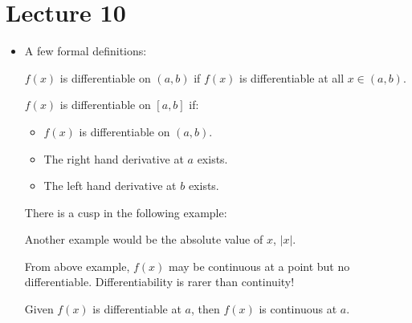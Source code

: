 \section{Lecture 10}
\begin{itemize}
    \item A few formal definitions:
    \begin{definition}
        $f(x)$ is differentiable on $(a,b)$ if $f(x)$ is differentiable at all $x\in (a,b)$.
    \end{definition}
    \begin{definition}
        $f(x)$ is differentiable on $[a,b]$ if:
        \begin{itemize}
            \item $f(x)$ is differentiable on $(a,b)$.
            \item The right hand derivative at $a$ exists.
            \item The left hand derivative at $b$ exists.
        \end{itemize}
    \end{definition}
    \begin{example}
    There is a cusp in the following example:
    \begin{center}
    \end{center}
    Another example would be the absolute value of $x$, $|x|$.
    \end{example}
    \begin{warning}
        From above example, $f(x)$ may be continuous at a point but no differentiable. Differentiability is rarer than continuity!
    \end{warning}
    \begin{theorem}
        Given $f(x)$ is differentiable at $a$, then $f(x)$ is continuous at $a$.

\end{theorem}
\end{itemize}
